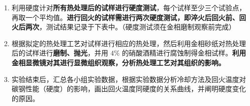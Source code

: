 \documentclass[a4paper,utf8]{article}
\begin{document}
\begin{enumerate}
\begin{enumerate}
        \end{enumerate}
        \item 利用硬度计对\textbf{所有热处理后的试样进行硬度测试}，每个试样至少三个试验点，再取一个平均值。\textbf{进行回火的试样需进行两次硬度测试，即淬火后回火前、回火后两次}，测试结果记录于下表中。（硬度测试须在金相磨制观察前完成）
        \item 根据拟定的热处理工艺对试样进行相应的热处理，然后利用金相砂纸对热处理后的试样进行\textbf{磨制、抛光}，并用 $4\%$ 的硝酸酒精进行腐蚀制得金相试样。\textbf{利用金相显微镜对其进行显微组织观察，分析热处理工艺对其组织的影响。}
        \item 实验结束后，汇总各小组实验数据，根据实验数据分析冷却方法及回火温度对碳钢性能（硬度）的影响，画出回火温度同硬度的关系曲线，并阐明硬度变化的原因。
    \end{enumerate}
\end{document}
